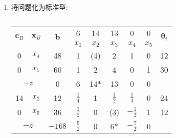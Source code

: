\begin{enumerate}[label=\alph*)]
    \item
        将问题化为标准型:

        \begin{table}[ht]
            \centering
            \caption{}
            \label{table:9a}
            \begin{tabular}{|c|c|c|c|c|c|c|c|c|}
                \hline
                \multirow{2}{*}{$\bm{c}_B$} & \multirow{2}{*}{$\bm{x}_B$} & \multirow{2}{*}{$\bm{b}$} & \multicolumn{1}{c}{6} & \multicolumn{1}{c}{14} & \multicolumn{1}{c}{13} & \multicolumn{1}{c}{0} & 0 & \multirow{2}{*}{$\bm{\theta}_i$} \\
                \cline{4-8}
                &&& \multicolumn{1}{c}{$x_1$} & \multicolumn{1}{c}{$x_2$} & \multicolumn{1}{c}{$x_3$} & \multicolumn{1}{c}{$x_4$} & $x_5$ & \\
                \hline
                0 & {\color{red}$x_4$} & 48 & \multicolumn{1}{c}{1} & \multicolumn{1}{c}{\cellcolor{LightBlue1}\color{red}(4)} & \multicolumn{1}{c}{2} & \multicolumn{1}{c}{1} & 0 & {\color{red}12} \\
                \cline{1-3}
                0 & $x_5$ & 60 & \multicolumn{1}{c}{1} & \multicolumn{1}{c}{\cellcolor{LightBlue1}2} & \multicolumn{1}{c}{4} & \multicolumn{1}{c}{0} & 1 & 30 \\
                \hline
                \multicolumn{2}{|c|}{$-z$} & 0 & \multicolumn{1}{c}{6} & \multicolumn{1}{c}{\cellcolor{LightBlue1}\color{red}14*} & \multicolumn{1}{c}{13} & \multicolumn{1}{c}{0} & 0 & \\

                \hline

                14 & $x_2$ & 12 & \multicolumn{1}{c}{$\tfrac{1}{4}$} & \multicolumn{1}{c}{1} & \multicolumn{1}{c}{\cellcolor{LightBlue1}$\tfrac{1}{2}$} & \multicolumn{1}{c}{$\tfrac{1}{4}$} & 0 & 24 \\
                \cline{1-3}
                0 & {\color{red}$x_5$} & 36 & \multicolumn{1}{c}{$\tfrac{1}{2}$} & \multicolumn{1}{c}{0} & \multicolumn{1}{c}{\cellcolor{LightBlue1}\color{red}(3)} & \multicolumn{1}{c}{$-\tfrac{1}{2}$} & 1 & {\color{red}12} \\
                \hline
                \multicolumn{2}{|c|}{$-z$} & $-168$ & \multicolumn{1}{c}{$\tfrac{5}{2}$} & \multicolumn{1}{c}{0} & \multicolumn{1}{c}{\cellcolor{LightBlue1}\color{red}6*} & \multicolumn{1}{c}{$-\tfrac{7}{2}$} & 0 & \\


\end{tabular}
\end{table}
\end{enumerate}
